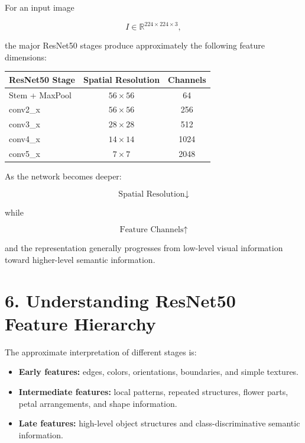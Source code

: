 \documentclass[10pt]{article}
\begin{document}
For an input image

\[
I\in\mathbb{R}^{224\times224\times3},
\]

the major ResNet50 stages produce approximately the following feature
dimensions:

\begin{center}

\begin{tabular}{|l|c|c|}
\hline
\textbf{ResNet50 Stage}
&
\textbf{Spatial Resolution}
&
\textbf{Channels}
\\
\hline

Stem + MaxPool
&
$56\times56$
&
64
\\
\hline

conv2\_x
&
$56\times56$
&
256
\\
\hline

conv3\_x
&
$28\times28$
&
512
\\
\hline

conv4\_x
&
$14\times14$
&
1024
\\
\hline

conv5\_x
&
$7\times7$
&
2048
\\
\hline

\end{tabular}

\end{center}

As the network becomes deeper:

\[
\boxed{
\text{Spatial Resolution}\downarrow
}
\]

while

\[
\boxed{
\text{Feature Channels}\uparrow
}
\]

and the representation generally progresses from low-level visual
information toward higher-level semantic information.

\section*{6. Understanding ResNet50 Feature Hierarchy}

The approximate interpretation of different stages is:

\begin{itemize}

\item \textbf{Early features:}
edges, colors, orientations, boundaries, and simple textures.

\item \textbf{Intermediate features:}
local patterns, repeated structures, flower parts, petal arrangements, and
shape information.

\item \textbf{Late features:}
high-level object structures and class-discriminative semantic information.

\end{itemize}
\end{document}
